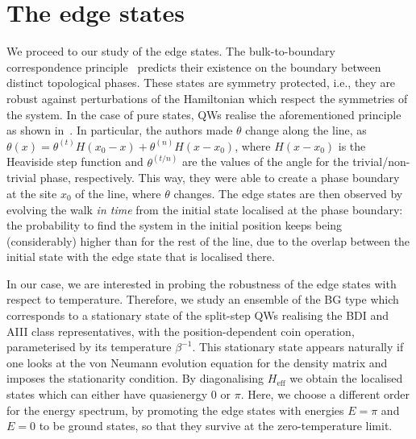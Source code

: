 \section{The edge states} 
\label{sec:edgeqw}
We proceed to our study of the edge states. The bulk-to-boundary correspondence principle~\cite{x:g:wen:91,ryu:hat:02} predicts their existence on the boundary between distinct topological phases. These states are symmetry protected, i.e., they are robust against perturbations of the Hamiltonian which respect the symmetries of the system. In the case of pure states, QWs realise the aforementioned principle as shown in~\cite{kit:rud:ber:dem:10,kit:12}. In particular, the authors made $\theta$ change along the line, as 
$\theta(x) = \theta^{(t)}H(x_0-x) + \theta^{(n)}H(x-x_0)$, where $H(x-x_0)$ is the Heaviside step function and $\theta^{(t/n)}$ are the values of the angle for the trivial/non-trivial phase, respectively. This way, they were able to create a phase boundary at the site $x_0$ of the line, where $\theta$ changes. The edge states are then observed by evolving the walk \textit{in time} from the initial state localised at the phase boundary: the probability to find the system in the initial position keeps being (considerably) higher than for the rest of the line, due to the overlap between the initial state with the edge state that is localised there.

In our case, we are interested in probing the robustness of the edge states with respect to temperature. Therefore, we study an ensemble of the BG type which corresponds to a stationary state of the split-step QWs realising the BDI and AIII class representatives, with the position-dependent coin operation, parameterised by its temperature $\beta^{-1}$. This stationary state appears naturally if one looks at the von Neumann evolution equation for the density matrix and imposes the stationarity condition. By diagonalising $H_{\text{eff}}$ we obtain the localised states which can either have quasienergy $0 \text{ or }\pi$. Here, we choose a different order for the energy spectrum, by promoting the edge states with energies $E=\pi$ and $E = 0$ to be ground states, so that they survive at the zero-temperature limit. 

